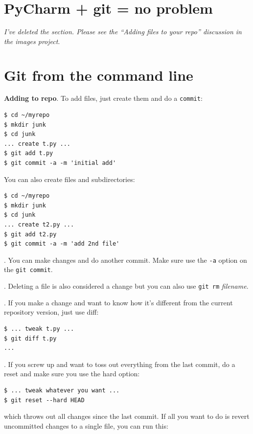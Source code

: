 \documentclass[titlepage]{tufte-book}
\newcounter{problem}
\begin{document}
\section{PyCharm + git = no problem}

{\em I've deleted the section. Please see the ``Adding files to your repo'' discussion in the images project}.

\section{Git from the command line}

{\bf Adding to repo}. To add files, just create them and do a {\tt commit}:

\begin{lstlisting}[style=BashInputStyle]
$ cd ~/myrepo
$ mkdir junk
$ cd junk
... create t.py ...
$ git add t.py
$ git commit -a -m 'initial add'
\end{lstlisting}

\noindent You can also create files and subdirectories:

\begin{lstlisting}[style=BashInputStyle]
$ cd ~/myrepo
$ mkdir junk
$ cd junk
... create t2.py ...
$ git add t2.py
$ git commit -a -m 'add 2nd file'
\end{lstlisting}

. You can make changes and do another commit. Make sure use the {\tt -a} option on the {\tt git commit}. 

. Deleting a file is also considered a change but you can also use {\tt git rm} {\em filename}.

. If you make a change and want to know how it's different from the current repository version, just use diff:

\begin{lstlisting}[style=BashInputStyle]
$ ... tweak t.py ...
$ git diff t.py
...
\end{lstlisting}

. If you screw up and want to toss out everything from the last commit, do a reset and make sure you use the hard option:

\begin{lstlisting}[style=BashInputStyle]
$ ... tweak whatever you want ...
$ git reset --hard HEAD
\end{lstlisting}

\noindent which throws out all changes since the last commit. If all you want to do is revert uncommitted changes to a single file, you can run this:
\end{document}

